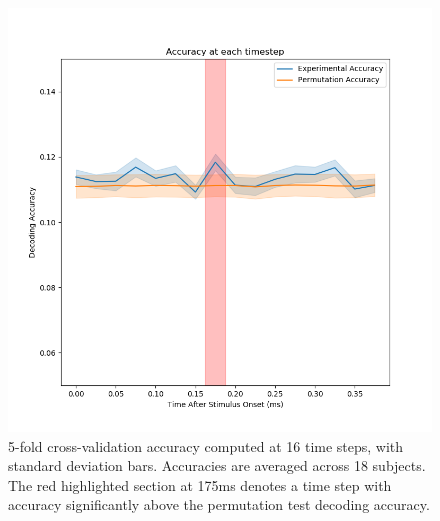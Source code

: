 \documentclass[../main.tex]{subfiles}
\begin{document}
\begin{figure}
    \centering
    \includegraphics[scale=0.7]{figures/results/timestep_accuracy_occipital316.png}
    \caption{5-fold cross-validation accuracy computed at 16 time steps, with standard deviation bars. Accuracies are averaged across 18 subjects. The red highlighted section at 175ms denotes a time step with accuracy significantly above the permutation test decoding accuracy.}
    \label{timestep_logistic_sensor}
\end{figure}
\end{document}
